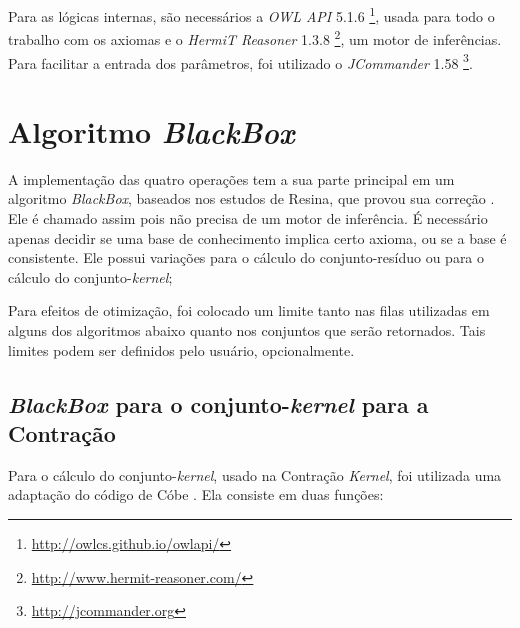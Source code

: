 Para as lógicas internas, são necessários a \textit{OWL API} 5.1.6 \footnote{\url{http://owlcs.github.io/owlapi/}}, usada para todo o trabalho com os axiomas e o \textit{HermiT Reasoner} 1.3.8 \footnote{\url{http://www.hermit-reasoner.com/}}, um motor de inferências. Para facilitar a entrada dos parâmetros, foi utilizado o \textit{JCommander} 1.58 \footnote{\url{http://jcommander.org}}.

\section{Algoritmo \textit{BlackBox}}

A implementação das quatro operações tem a sua parte principal em um algoritmo \textit{BlackBox}, baseados nos estudos de Resina, que provou sua correção \citep{logicaResina}. Ele é chamado assim pois não precisa de um motor de inferência. É necessário apenas decidir se uma base de conhecimento implica certo axioma, ou se a base é consistente. Ele possui variações para o cálculo do conjunto-resíduo ou para o cálculo do conjunto-\textit{kernel};

Para efeitos de otimização, foi colocado um limite tanto nas filas utilizadas em alguns dos algoritmos abaixo quanto nos conjuntos que serão retornados. Tais limites podem ser definidos pelo usuário, opcionalmente.

\subsection{\textit{BlackBox} para o conjunto-\textit{kernel} para a Contração}

Para o cálculo do conjunto-\textit{kernel}, usado na Contração \textit{Kernel}, foi utilizada uma adaptação do código de Cóbe \citep{revisaoCobe}. Ela consiste em duas funções:

